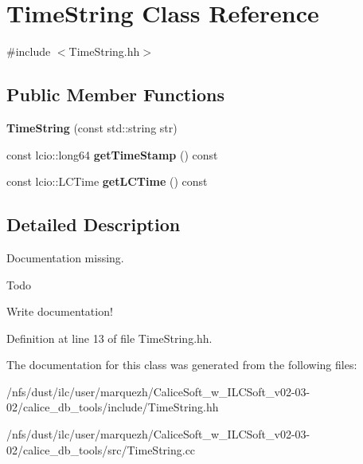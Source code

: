 \section{Time\-String Class Reference}
\label{classTimeString}


{\ttfamily \#include $<$Time\-String.\-hh$>$}

\subsection*{Public Member Functions}
\begin{DoxyCompactItemize}
\item 
{\bfseries Time\-String} (const std\-::string str)\label{classTimeString_a60433b1fbd3e0e4d2de19332832c4d36}

\item 
const lcio\-::long64 {\bfseries get\-Time\-Stamp} () const \label{classTimeString_ae847cb33e3f42037565f0aebec804d6f}

\item 
const lcio\-::\-L\-C\-Time {\bfseries get\-L\-C\-Time} () const \label{classTimeString_a9ceb7a98daa11f704edaec9f5793178f}

\end{DoxyCompactItemize}


\subsection{Detailed Description}
Documentation missing. \begin{DoxyRefDesc}{Todo}
\item[{\bf Todo}]Write documentation!\end{DoxyRefDesc}


Definition at line 13 of file Time\-String.\-hh.



The documentation for this class was generated from the following files\-:\begin{DoxyCompactItemize}
\item 
/nfs/dust/ilc/user/marquezh/\-Calice\-Soft\-\_\-w\-\_\-\-I\-L\-C\-Soft\-\_\-v02-\/03-\/02/calice\-\_\-db\-\_\-tools/include/Time\-String.\-hh\item 
/nfs/dust/ilc/user/marquezh/\-Calice\-Soft\-\_\-w\-\_\-\-I\-L\-C\-Soft\-\_\-v02-\/03-\/02/calice\-\_\-db\-\_\-tools/src/Time\-String.\-cc\end{DoxyCompactItemize}
